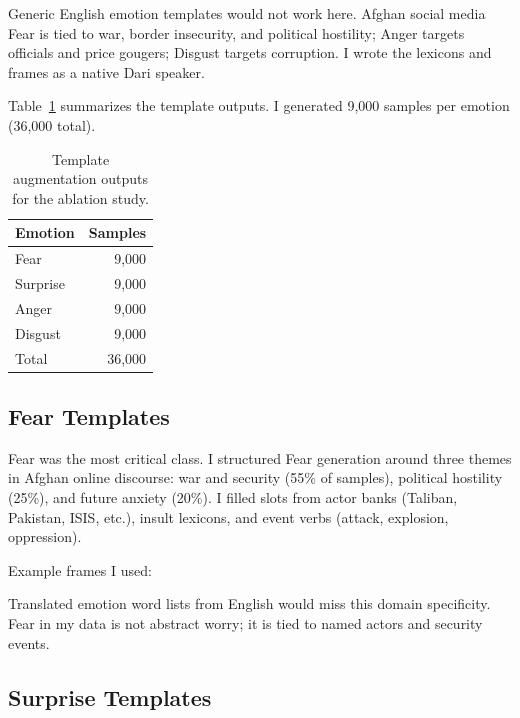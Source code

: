 \documentclass[11pt,a4paper]{article}
\newcommand{\dariit}[1]{\textit{\begin{persian}#1\end{persian}}}
\begin{document}
Generic English emotion templates would not work here. Afghan social media Fear is tied to war, border insecurity, and political hostility; Anger targets officials and price gougers; Disgust targets corruption. I wrote the lexicons and frames as a native Dari speaker.

Table~\ref{tab:template_outputs} summarizes the template outputs. I generated 9,000 samples per emotion (36,000 total).

\begin{table}[H]
\centering
\caption{Template augmentation outputs for the ablation study.}
\label{tab:template_outputs}
\begin{tabular}{@{}lr@{}}
\toprule
Emotion & Samples \\
\midrule
Fear     & 9,000 \\
Surprise & 9,000 \\
Anger    & 9,000 \\
Disgust  & 9,000 \\
\midrule
Total    & 36,000 \\
\bottomrule
\end{tabular}
\end{table}

\subsection{Fear Templates}

Fear was the most critical class. I structured Fear generation around three themes in Afghan online discourse: war and security (55\% of samples), political hostility (25\%), and future anxiety (20\%). I filled slots from actor banks (Taliban, Pakistan, ISIS, etc.), insult lexicons, and event verbs (attack, explosion, oppression).

Example frames I used:

Translated emotion word lists from English would miss this domain specificity. Fear in my data is not abstract worry; it is tied to named actors and security events.

\subsection{Surprise Templates}
\end{document}
